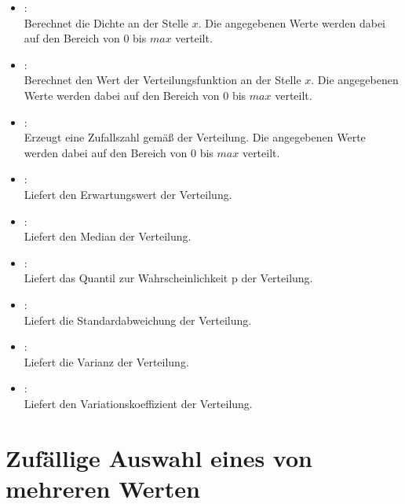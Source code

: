 \begin{itemize}

\item
{}:\\
Berechnet die Dichte an der Stelle $x$.
Die angegebenen Werte werden dabei auf den Bereich von 0 bis $max$ verteilt.

\item
{}:\\
Berechnet den Wert der Verteilungsfunktion an der Stelle $x$.
Die angegebenen Werte werden dabei auf den Bereich von 0 bis $max$ verteilt.

\item
{}:\\
Erzeugt eine Zufallszahl gemäß der Verteilung.
Die angegebenen Werte werden dabei auf den Bereich von 0 bis $max$ verteilt.

\item
{}:\\
Liefert den Erwartungswert der Verteilung.

\item
{}:\\
Liefert den Median der Verteilung.

\item
{}:\\
Liefert das Quantil zur Wahrscheinlichkeit p der Verteilung.

\item
{}:\\
Liefert die Standardabweichung der Verteilung.

\item
{}:\\
Liefert die Varianz der Verteilung.

\item
{}:\\
Liefert den Variationskoeffizient der Verteilung.

\end{itemize}



\section{Zufällige Auswahl eines von mehreren Werten}

